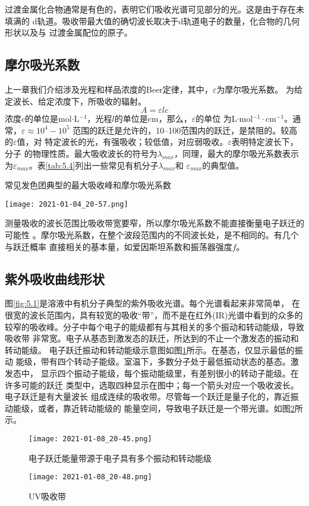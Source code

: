 过渡金属化合物通常是有色的，表明它们吸收光谱可见部分的光。这是由于存在未填满的
d轨道。吸收带最大值的确切波长取决于d轨道电子的数量，化合物的几何形状以及与
过渡金属配位的原子。
\subsection{摩尔吸光系数}
上一章我们介绍涉及光程和样品浓度的Beer定律，其中，$\varepsilon$为摩尔吸光系数。
为给定波长、给定浓度下，所吸收的辐射。
\begin{equation}
    A = \varepsilon l c
    \label{5.2}
\end{equation}
浓度$c$的单位是mol$\cdot$L$^{-1}$，光程$l$的单位是cm，那么，$\varepsilon$的单位
为L$\cdot$mol$^{-1}\cdot$cm$^{-1}$。通常，$\varepsilon\approx 10^4 - 10^5$ 
范围的跃迁是允许的，10--100范围内的跃迁，是禁阻的。较高的$\varepsilon$值，对
特定波长的光，有强吸收；较低值，对应弱吸收。$\varepsilon$表明特定波长下，分子
的物理性质。最大吸收波长的符号为$\lambda_{max}$，同理，最大的摩尔吸光系数表示
为$\varepsilon_{max}$。表\ref{tab:5.4}列出一些常见有机分子$\lambda_{max}$和
$\varepsilon_{max}$的典型值。
\begin{table}[htbp]
    \centering
    \caption{常见发色团典型的最大吸收峰和摩尔吸光系数}
    \texttt{[image: 2021-01-04\_20-57.png]}
    \label{tab:5.4}
\end{table}

测量吸收的波长范围比吸收带宽要窄，所以摩尔吸光系数不能直接衡量电子跃迁的可能性
。摩尔吸光系数，在整个波段范围内的不同波长处，是不相同的。有几个与跃迁概率
直接相关的基本量，如爱因斯坦系数和振荡器强度$f$。
\subsection{紫外吸收曲线形状}
图\ref{fig:5.1}是溶液中有机分子典型的紫外吸收光谱。每个光谱看起来非常简单，
在很宽的波长范围内，具有较宽的吸收“带”，而不是在红外(IR)光谱中看到的众多的
较窄的吸收峰。分子中每个电子的能级都有与其相关的多个振动和转动能级，导致吸收带
非常宽。电子从基态到激发态的跃迁，所达到的不止一个激发态的振动和转动能级。
电子跃迁振动和转动能级示意图如图\ref{fig:5.9}所示。在基态，仅显示最低的振动
能级，带有四个转动子能级。室温下，多数分子处于最低振动状态的基态。激发态中，
显示四个振动子能级，每个振动能级里，有差别很小的转动子能级。在许多可能的跃迁
类型中，选取四种显示在图中；每一个箭头对应一个吸收波长。电子跃迁是有大量波长
组成连续的吸收带。尽管每一个跃迁是量子化的，靠近振动能级，或者，靠近转动能级的
能量空间，导致电子跃迁是一个带光谱。如图\ref{fig:5.10}所示。
\begin{figure}[htpb]
    \centering
    \texttt{[image: 2021-01-08\_20-45.png]}
    \caption{电子跃迁能量带源于电子具有多个振动和转动能级}
    \label{fig:5.9}
\end{figure}
\begin{figure}[htpb]
    \centering
    \texttt{[image: 2021-01-08\_20-48.png]}
    \caption{UV吸收带}
    \label{fig:5.10}
\end{figure}

